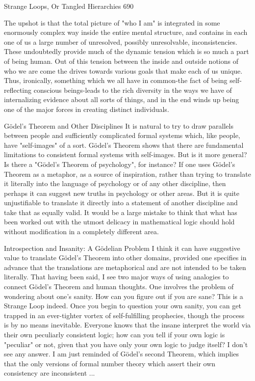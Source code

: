 Strange Loops, Or Tangled Hierarchies                                                      690

        The upshot is that the total picture of "who I am" is integrated in some
enormously complex way inside the entire mental structure, and contains in each one of
us a large number of unresolved, possibly unresolvable, inconsistencies. These
undoubtedly provide much of the dynamic tension which is so much a part of being
human. Out of this tension between the inside and outside notions of who we are come
the drives towards various goals that make each of us unique. Thus, ironically, something
which we all have in common-the fact of being self-reflecting conscious beings-leads to
the rich diversity in the ways we have of internalizing evidence about all sorts of things,
and in the end winds up being one of the major forces in creating distinct individuals.

                     Gödel’s Theorem and Other Disciplines
It is natural to try to draw parallels between people and sufficiently complicated formal
systems which, like people, have "self-images" of a sort. Gödel’s Theorem shows that
there are fundamental limitations to consistent formal systems with self-images. But is it
more general? Is there a "Gödel’s Theorem of psychology", for instance?
        If one uses Gödel’s Theorem as a metaphor, as a source of inspiration, rather than
trying to translate it literally into the language of psychology or of any other discipline,
then perhaps it can suggest new truths in psychology or other areas. But it is quite
unjustifiable to translate it directly into a statement of another discipline and take that as
equally valid. It would be a large mistake to think that what has been worked out with the
utmost delicacy in mathematical logic should hold without modification in a completely
different area.

               Introspection and Insanity: A Gödelian Problem
I think it can have suggestive value to translate Gödel’s Theorem into other domains,
provided one specifies in advance that the translations are metaphorical and are not
intended to be taken literally. That having been said, I see two major ways of using
analogies to connect Gödel’s Theorem and human thoughts. One involves the problem of
wondering about one's sanity. How can you figure out if you are sane? This is a Strange
Loop indeed. Once you begin to question your own sanity, you can get trapped in an
ever-tighter vortex of self-fulfilling prophecies, though the process is by no means
inevitable. Everyone knows that the insane interpret the world via their own peculiarly
consistent logic; how can you tell if your own logic is "peculiar" or not, given that you
have only your own logic to judge itself? I don't see any answer. I am just reminded of
Gödel’s second Theorem, which implies that the only versions of formal number theory
which assert their own consistency are inconsistent ...




